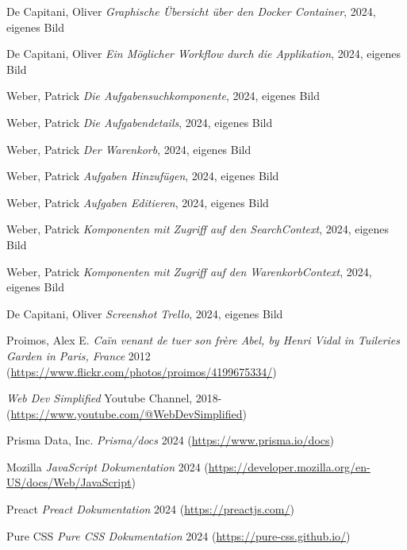 \documentclass[12pt,a4paper]{scrartcl} %
\begin{document}
\renewcommand{\refname}{Quellenverzeichnis}

\begin{thebibliography}{11} 

 De Capitani, Oliver {\em Graphische Übersicht über den Docker Container}, 2024, eigenes Bild

 De Capitani, Oliver {\em Ein Möglicher Workflow durch die Applikation}, 2024, eigenes Bild

 Weber, Patrick {\em Die Aufgabensuchkomponente}, 2024, eigenes Bild

 Weber, Patrick {\em Die Aufgabendetails}, 2024, eigenes Bild

 Weber, Patrick {\em Der Warenkorb}, 2024, eigenes Bild

 Weber, Patrick {\em Aufgaben Hinzufügen}, 2024, eigenes Bild

 Weber, Patrick {\em Aufgaben Editieren}, 2024, eigenes Bild

 Weber, Patrick {\em Komponenten mit Zugriff auf den SearchContext}, 2024, eigenes Bild

 Weber, Patrick {\em Komponenten mit Zugriff auf den WarenkorbContext}, 2024, eigenes Bild

 De Capitani, Oliver {\em Screenshot Trello}, 2024, eigenes Bild

 Proimos, Alex E. {\em Caïn venant de tuer son frère Abel, by Henri Vidal in Tuileries Garden in Paris, France} 2012 (\url{https://www.flickr.com/photos/proimos/4199675334/})

 {\em Web Dev Simplified} Youtube Channel, 2018- (\url{https://www.youtube.com/@WebDevSimplified})

 Prisma Data, Inc. {\em Prisma/docs} 2024 (\url{https://www.prisma.io/docs})

 Mozilla {\em JavaScript Dokumentation} 2024 (\url{https://developer.mozilla.org/en-US/docs/Web/JavaScript})

 Preact {\em Preact Dokumentation} 2024 (\url{https://preactjs.com/})

 Pure CSS {\em Pure CSS Dokumentation} 2024 (\url{https://pure-css.github.io/})

\end{thebibliography}
\end{document}
